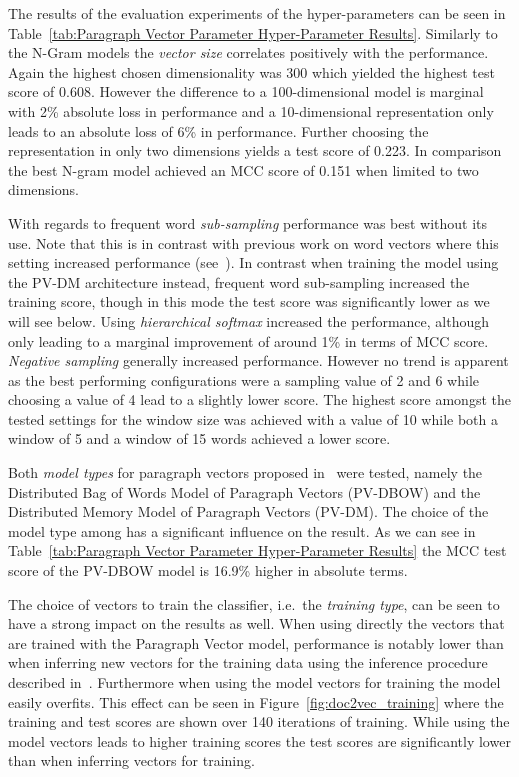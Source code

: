 The results of the evaluation experiments of the hyper-parameters can be seen in Table~\ref{tab:Paragraph Vector Parameter Hyper-Parameter Results}. Similarly to the N-Gram models the \emph{vector size} correlates positively with the performance. Again the highest chosen dimensionality was 300 which yielded the highest test score of 0.608. However the difference to a 100-dimensional model is marginal with 2\% absolute loss in performance and a 10-dimensional representation only leads to an absolute loss of 6\% in performance. Further choosing the representation in only two dimensions yields a test score of 0.223. In comparison the best N-gram model achieved an \gls{MCC} score of 0.151 when limited to two dimensions.

With regards to frequent word \emph{sub-sampling} performance was best without its use. Note that this is in contrast with previous work on word vectors where this setting increased performance (see~\cite{Mikolov:2013ab}). In contrast when training the model using the PV-DM architecture instead, frequent word sub-sampling increased the training score, though in this mode the test score was significantly lower as we will see below.  Using \emph{hierarchical softmax} increased the performance, although only leading to a marginal improvement of around 1\% in terms of MCC score. \emph{Negative sampling} generally increased performance. However no trend is apparent as the best performing configurations were a sampling value of 2 and 6 while choosing a value of 4 lead to a slightly lower score. The highest score amongst the tested settings for the window size was achieved with a value of 10 while both a window of 5 and a window of 15 words achieved a lower score.

Both \emph{model types} for paragraph vectors proposed in~\cite{Le:2014aa} were tested, namely the Distributed Bag of Words Model of Paragraph Vectors (PV-DBOW) and the Distributed Memory Model of Paragraph Vectors (PV-DM). The choice of the model type among has a significant influence on the result. As we can see in Table~\ref{tab:Paragraph Vector Parameter Hyper-Parameter Results} the \gls{MCC} test score of the PV-DBOW model is 16.9\% higher in absolute terms.

The choice of vectors to train the classifier, i.e.\ the \emph{training type}, can be seen to have a strong impact on the results as well. When using directly the vectors that are trained with the Paragraph Vector model, performance is notably lower than when inferring new vectors for the training data using the inference procedure described in~\cite{Le:2014aa}. Furthermore when using the model vectors for training the model easily overfits. This effect can be seen in Figure~\ref{fig:doc2vec_training} where the training and test scores are shown over 140 iterations of training. While using the model vectors leads to higher training scores the test scores are significantly lower than when inferring vectors for training.

